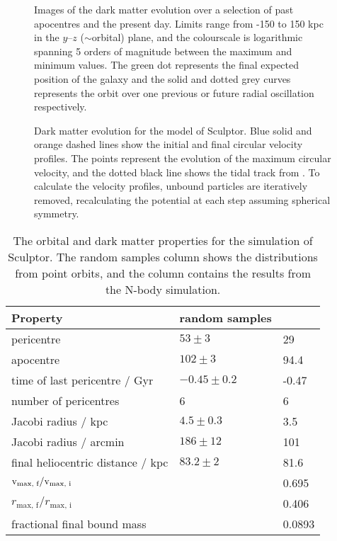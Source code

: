 \begin{figure}
\centering
{}
\caption[Sculptor simulation snapshots]{Images of the dark matter
evolution over a selection of past apocentres and the present day.
Limits range from -150 to 150 kpc in the \(y\)--\(z\) (\(\sim\)orbital)
plane, and the colourscale is logarithmic spanning 5 orders of magnitude
between the maximum and minimum values. The green dot represents the
final expected position of the galaxy and the solid and dotted grey
curves represents the orbit over one previous or future radial
oscillation respectively.}\label{fig:scl_sim_images}
\end{figure}

\begin{figure}
\centering
{}
\caption[Sculptor tidal tracks]{Dark matter evolution for the
\smallperi{} model of Sculptor. Blue solid and orange dashed lines show
the initial and final circular velocity profiles. The points represent
the evolution of the maximum circular velocity, and the dotted black
line shows the tidal track from \citet{EN2021}. To calculate the
velocity profiles, unbound particles are iteratively removed,
recalculating the potential at each step assuming spherical
symmetry.}\label{fig:scl_tidal_track}
\end{figure}

\begin{table*}[t]
\centering
\caption[Simulation results for Sculptor’s dark matter]{The orbital and dark matter properties for the simulation of Sculptor. The random samples column shows the distributions from point orbits, and the \smallperi{} column contains the results from the N-body simulation. }
\label{tbl:scl_sim_results}
\begin{tabular}{lll}
\toprule
Property & random samples & \smallperi{}\\
\midrule
pericentre & $53\pm3$ & 29\\
apocentre & $102\pm3$ & 94.4\\
time of last pericentre / Gyr & $-0.45 \pm 0.2$ & -0.47\\
number of pericentres & 6 & 6\\
Jacobi radius / kpc & $4.5 \pm 0.3$ & 3.5\\
Jacobi radius / arcmin & $186\pm12$ & 101\\
final heliocentric distance / kpc & $83.2\pm2$ & 81.6\\
${\rm v}_\textrm{max, f} / {\rm v}_\textrm{max, i}$ &  & 0.695\\
$r_\textrm{max, f} / r_\textrm{max, i}$ &  & 0.406\\
fractional final bound mass &  & 0.0893\\
\bottomrule
\end{tabular}
\end{table*}

